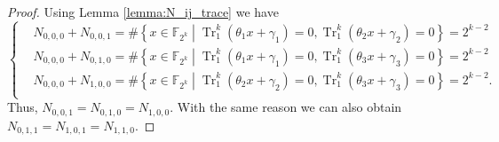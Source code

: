 \documentclass{article}
\newcommand{\F}{\mathbb{F}}
\newcommand{\0}{\textbf{0}}
\newcommand{\1}{\textbf{1}}
\newcommand{\TRACE}{\operatorname{Tr}_1^k}
\theoremstyle{plain}
\begin{document}
    \begin{proof}
        Using Lemma \ref{lemma:N_ij_trace} we have  
        \begin{equation}\label{eq:from_lemma_1}\left\{\begin{alignedat}{3}
        &N_{0,0,0}+N_{0,0,1}=\#\left\{x\in\F_{2^k}\middle|\TRACE\left(\theta_1x+\gamma_1\right)=0, \TRACE\left(\theta_2x+\gamma_2\right)=0\right\}=2^{k-2}\\
        &N_{0,0,0}+N_{0,1,0}=\#\left\{x\in\F_{2^k}\middle|\TRACE\left(\theta_1x+\gamma_1\right)=0, \TRACE\left(\theta_3x+\gamma_3\right)=0\right\}=2^{k-2}\\
        &N_{0,0,0}+N_{1,0,0}=\#\left\{x\in\F_{2^k}\middle|\TRACE\left(\theta_2x+\gamma_2\right)=0, \TRACE\left(\theta_3x+\gamma_3\right)=0\right\}=2^{k-2}.\\
        \end{alignedat}\right.\end{equation}
        Thus, $ N_{0,0,1}=N_{0,1,0}=N_{1,0,0} $. With the same reason we can also obtain  $ N_{0,1,1}=N_{1,0,1}=N_{1,1,0} $. 


\end{proof}
\end{document}
